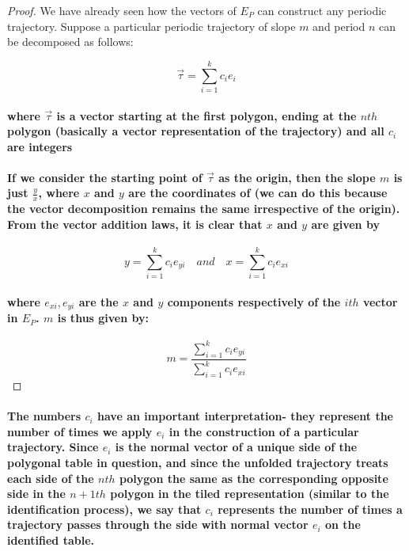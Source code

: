 \documentclass{report}
\begin{document}
\begin{proof}
{We have already seen how the vectors of $E_P$ can construct any periodic trajectory. Suppose a particular periodic trajectory of slope $m$ and period $n$ can be decomposed as follows:

\begin{equation}
\vec{\tau}=\sum_{i=1}^k c_ie_i 
\end{equation}

\paragraph{where $\vec{\tau}$ is a vector starting at the first polygon, ending at the $nth$ polygon (basically a vector representation of the trajectory) and all $c_i$ are integers}

\paragraph{If we consider the starting point of $\vec{\tau}$ as the origin, then the slope $m$ is just $\frac{y}{x}$, where $x$ and $y$ are the coordinates of (we can do this because the vector decomposition remains the same irrespective of the origin). From the vector addition laws, it is clear that $x$ and $y$ are given by}

\begin{equation}
y=\sum_{i=1}^k c_ie_{yi}\quad and
\quad x=\sum_{i=1}^k c_ie_{xi}
\end{equation}

\paragraph{where $e_{xi}, e_{yi}$ are the $x$ and $y$ components respectively of the $ith$ vector in $E_P$. $m$ is thus given by:}

\begin{equation}
m=\frac{\sum_{i=1}^k  c_ie_{yi} }{\sum_{i=1}^k  c_ie_{xi} }
\end{equation}
}
\end{proof}

\paragraph{The numbers $c_i$ have an important interpretation- they represent the number of times we apply $e_i$ in the construction of a particular trajectory. Since $e_i$ is the normal vector of a unique side of the polygonal table in question, and since the unfolded trajectory treats each side of the $nth$ polygon the same as the corresponding opposite side in the $n+1th$ polygon in the tiled representation (similar to the identification process), we say that $c_i$ represents the number of times a trajectory passes through the side with normal vector $e_i$ on the identified table.}
\end{document}
